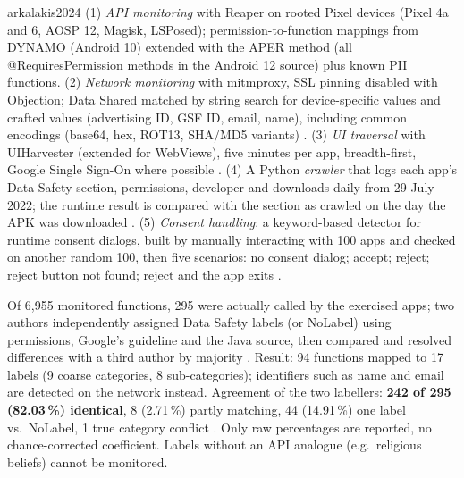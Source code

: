 \begin{papercard}{arkalakis2024}
 (1) \emph{API monitoring} with Reaper on rooted Pixel devices (Pixel 4a and 6, AOSP 12, Magisk, LSPosed); permission-to-function mappings from DYNAMO (Android 10) extended with the APER method (all @RequiresPermission methods in the Android 12 source) plus known PII functions. (2) \emph{Network monitoring} with mitmproxy, SSL pinning disabled with Objection; Data Shared matched by string search for device-specific values and crafted values (advertising ID, GSF ID, email, name), including common encodings (base64, hex, ROT13, SHA/MD5 variants) . (3) \emph{UI traversal} with UIHarvester (extended for WebViews), five minutes per app, breadth-first, Google Single Sign-On where possible . (4) A Python \emph{crawler} that logs each app's Data Safety section, permissions, developer and downloads daily from 29 July 2022; the runtime result is compared with the section as crawled on the day the APK was downloaded . (5) \emph{Consent handling}: a keyword-based detector for runtime consent dialogs, built by manually interacting with 100 apps and checked on another random 100, then five scenarios: no consent dialog; accept; reject; reject button not found; reject and the app exits .

 Of 6,955 monitored functions, 295 were actually called by the exercised apps; two authors independently assigned Data Safety labels (or NoLabel) using permissions, Google's guideline and the Java source, then compared and resolved differences with a third author by majority . Result: 94 functions mapped to 17 labels (9 coarse categories, 8 sub-categories); identifiers such as name and email are detected on the network instead. Agreement of the two labellers: \textbf{242 of 295 (82.03\,\%) identical}, 8 (2.71\,\%) partly matching, 44 (14.91\,\%) one label vs.\ NoLabel, 1 true category conflict . Only raw percentages are reported, no chance-corrected coefficient. Labels without an API analogue (e.g.\ religious beliefs) cannot be monitored.


\end{papercard}
